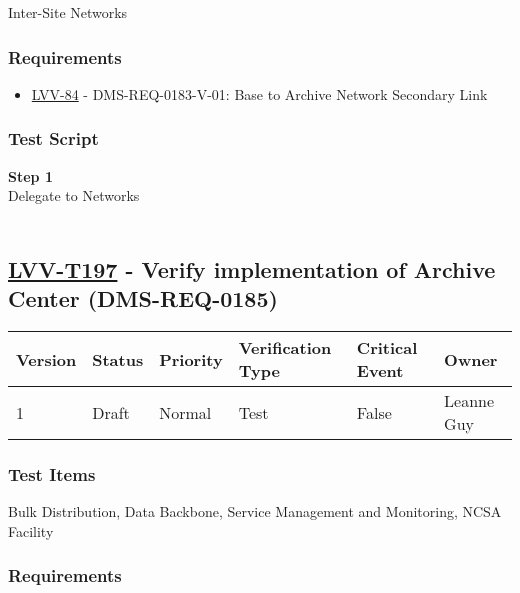 Inter-Site Networks~

\hypertarget{requirements-173}{%
\subsubsection{Requirements}\label{requirements-173}}

\begin{itemize}
\tightlist
\item
  \href{https://jira.lsstcorp.org/browse/LVV-84}{LVV-84} -
  DMS-REQ-0183-V-01: Base to Archive Network Secondary Link
\end{itemize}

\hypertarget{test-script-173}{%
\subsubsection{Test Script}\label{test-script-173}}

\textbf{Step 1}\\
Delegate to Networks\\
~\\

\hypertarget{lvv-t197---verify-implementation-of-archive-center-dms-req-0185}{%
\subsection{\texorpdfstring{\href{https://jira.lsstcorp.org/secure/Tests.jspa\#/testCase/LVV-T197}{LVV-T197}
- Verify implementation of Archive Center
(DMS-REQ-0185)}{LVV-T197 - Verify implementation of Archive Center (DMS-REQ-0185)}}\label{lvv-t197---verify-implementation-of-archive-center-dms-req-0185}}

\begin{longtable}[]{@{}llllll@{}}
\toprule
Version & Status & Priority & Verification Type & Critical Event &
Owner\tabularnewline
\midrule
\endhead
1 & Draft & Normal & Test & False & Leanne Guy\tabularnewline
\bottomrule
\end{longtable}

\hypertarget{test-items-173}{%
\subsubsection{Test Items}\label{test-items-173}}

Bulk Distribution, Data Backbone, Service Management and Monitoring,
NCSA Facility

\hypertarget{requirements-174}{%
\subsubsection{Requirements}\label{requirements-174}}

